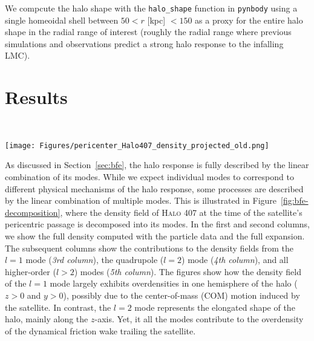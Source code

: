 \documentclass[twocolumn, linenumbers]{openjournal}
\begin{document}
We compcute the halo shape with the \texttt{halo\_shape} 
function in \texttt{pynbody} using a single homeoidal shell between $50<r$ [kpc] $< 150$ 
as a proxy for the entire halo  shape in the radial range of interest 
(roughly the radial range where previous simulations and observations predict a 
strong halo response to the infalling LMC). 

\section{Results}~\label{sec:results}

\begin{figure*}
    \texttt{[image: Figures/pericenter\_Halo407\_density\_projected\_old.png]}
    \caption{Example density field computation using the BFE and decomposition for Halo407 from 
    the Milky Way-est simulation suite showing from left to right (1) projected density of 
    smoothly accreted host particles, (2) full BFE with $l=5$ and $n=10$, (3) density of $l=1$ 
    mode relative to $l=0$, (4) density of $l=2$ mode relative to $l=0$, 
    and (5) density of $l>1$ mode relative to $l=0$. For the leftmost plot, the particle density 
    is projected in the X-Y plane (X-Z), while for the other plots, the plot 
    shows a cross-sectional slice at $z=0$ ($y=0$). The colorbars for panels (1) and (2) are 
    scaled arbitrarily, while plots (3-5) show the density contrast scaled between -1 and 1. 
    The dashed line shows the orbit of the LMC analog and the black dot shows the current position 
    (chosen to be roughly at the pericentric passage). Also shown in 
    panels (3) and (4) is an arrow indicating the direction of of the $l=1$ mode (3) and the 
    principal axis of the halo (4) (see discussion in Section~\ref{sec:orientation} for more details).} 
    \label{fig:bfe-decomposition}
    \end{figure*}
    
As discussed in Section~\ref{sec:bfe}, the halo response is fully described by the linear 
combination of its modes. While we expect individual modes to correspond to different 
physical mechanisms of the halo response, some processes are described by the linear 
combination of multiple modes. This is illustrated in Figure~\ref{fig:bfe-decomposition}, 
where the density field of \textsc{Halo 407} at the time of the satellite's pericentric 
passage is decomposed into its modes. In the first and second columns, we show the full 
density computed with the particle data and the full expansion. The subsequent columns 
show the contributions to the density fields from the $l=1$ mode (\emph{3rd column}), 
the quadrupole ($l=2$) mode (\emph{4th column}), and all higher-order ($l>2$) modes 
(\emph{5th column}). The figures show how the density field of the $l=1$ mode largely 
exhibits overdensities in one hemisphere of the halo ($z > 0$ and $y > 0$), possibly 
due to the center-of-mass (COM) motion induced by the satellite. In contrast, 
the $l=2$ mode represents the elongated shape of the halo, mainly along the $z$-axis. 
Yet, it all the modes contribute to the overdensity of the dynamical 
friction wake trailing the satellite.
\end{document}

